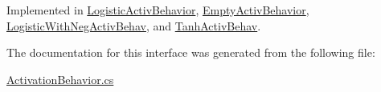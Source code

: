 Implemented in \mbox{\hyperlink{class_logistic_activ_behavior_a20a20f3e29d8aad19f35067a9304ee96}{Logistic\+Activ\+Behavior}}, \mbox{\hyperlink{class_empty_activ_behavior_acc640ba59f2c258030501f8ec9c537d8}{Empty\+Activ\+Behavior}}, \mbox{\hyperlink{class_logistic_with_neg_activ_behav_abfe284e0e1854e171412cb2e6f0ad8e3}{Logistic\+With\+Neg\+Activ\+Behav}}, and \mbox{\hyperlink{class_tanh_activ_behav_a7aa47f0ab45debc7cc89d62334e28b77}{Tanh\+Activ\+Behav}}.



The documentation for this interface was generated from the following file\+:\begin{DoxyCompactItemize}
\item 
\mbox{\hyperlink{_activation_behavior_8cs}{Activation\+Behavior.\+cs}}\end{DoxyCompactItemize}
